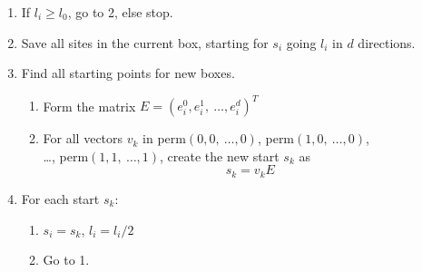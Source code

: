 \begin{enumerate}
    \item If $l_i \geq l_0$, go to 2, else stop.
%
    \item Save all sites in the current box, starting for $s_i$ going $l_i$ in $d$ directions.
%
    \item Find all starting points for new boxes.
%
    \begin{enumerate}[label=(\roman*)]
%
        \item Form the matrix $E = (e_i^0, e_i^1, \  \ldots, e_i^d)^T$
%
        \item For all vectors $v_k$ in perm$(0, 0, \ \ldots , 0)$, perm$(1, 0, \ \ldots , 0)$, \\ \ldots, perm$(1, 1, \ \ldots , 1)$, create the new start $s_k$ as $$s_k = v_k E$$
%
    \end{enumerate}
%
    \item For each start $s_k$:
    \begin{enumerate}[label=(\roman*)]
        \item $s_i = s_k$, $l_i = l_i / 2$
        \item Go to 1.
    \end{enumerate}
%
\end{enumerate}
